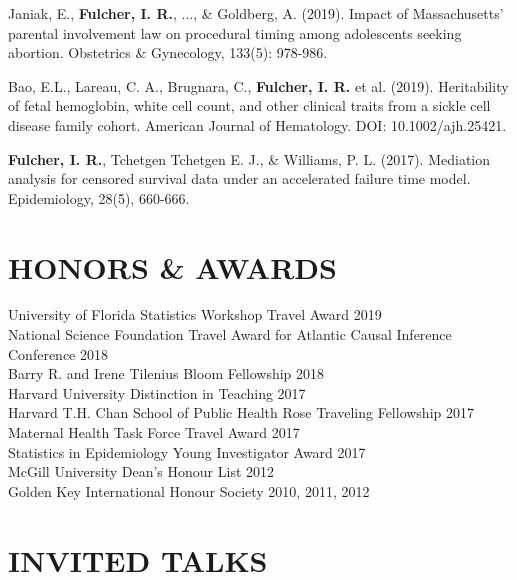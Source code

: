 \documentclass[12pt]{article}
\begin{document}
\begin{etaremune}
	\item Janiak, E., \textbf{Fulcher, I. R.}, ..., \& Goldberg, A. (2019). Impact of Massachusetts' parental involvement law on procedural timing among adolescents seeking abortion. Obstetrics \& Gynecology, 133(5): 978-986.
	
	\item Bao, E.L., Lareau, C. A., Brugnara, C., \textbf{Fulcher, I. R.} et al. (2019). Heritability of fetal hemoglobin, white cell count, and other clinical traits from a sickle cell disease family cohort. American Journal of Hematology. DOI: 10.1002/ajh.25421. 
	
	\item \textbf{Fulcher, I. R.}, Tchetgen Tchetgen E. J., \& Williams, P. L. (2017). Mediation analysis for censored survival data under an accelerated failure time model.  Epidemiology, 28(5), 660-666. 
\end{etaremune}


\section*{\textbf{{\large H}{ONORS} {\large \&} {\large A}{WARDS}}}
University of Florida Statistics Workshop Travel Award \hfill \hfill 2019 \\
National Science Foundation Travel Award for Atlantic Causal Inference Conference \hfill \hfill	2018 \\
Barry R. and Irene Tilenius Bloom Fellowship \hfill \hfill	2018 \\
Harvard University Distinction in Teaching \hfill \hfill 2017 \\
Harvard T.H. Chan School of Public Health Rose Traveling Fellowship \hfill \hfill	2017 \\
Maternal Health Task Force Travel Award \hfill \hfill	2017 \\
Statistics in Epidemiology Young Investigator Award  \hfill \hfill	2017 \\
McGill University Dean's Honour List  \hfill \hfill	2012 \\
Golden Key International Honour Society  \hfill \hfill2010, 2011, 2012 


\section*{\textbf{{\large I}{NVITED} {\large T}{ALKS}}}   
\end{document}
